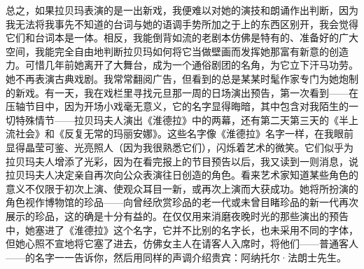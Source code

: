 \par 总之，如果拉贝玛表演的是一出新戏，我便难以对她的演技和朗诵作出判断，因为我无法将我事先不知道的台词与她的语调手势所加之于上的东西区别开，我会觉得它们和台词本是一体。相反，我能倒背如流的老剧本仿佛是特有的、准备好的广大空间，我能完全自由地判断拉贝玛如何将它当做壁画而发挥她那富有新意的创造力。可惜几年前她离开了大舞台，成为一个通俗剧团的名角，为它立下汗马功劳。她不再表演古典戏剧。我常常翻阅广告，但看到的总是某某时髦作家专门为她炮制的新戏。有一天，我在戏栏里寻找元旦那一周的日场演出预告，第一次看到——在压轴节目中，因为开场小戏毫无意义，它的名字显得晦暗，其中包含对我陌生的一切特殊情节——拉贝玛夫人演出《淮德拉》中的两幕，还有第二天第三天的《半上流社会》和《反复无常的玛丽安娜》。这些名字像《淮德拉》名字一样，在我眼前显得晶莹可鉴、光亮照人（因为我很熟悉它们），闪烁着艺术的微笑。它们似乎为拉贝玛夫人增添了光彩，因为在看完报上的节目预告以后，我又读到一则消息，说拉贝玛夫人决定亲自再次向公众表演往日创造的角色。看来艺术家知道某些角色的意义不仅限于初次上演、使观众耳目一新，或再次上演而大获成功。她将所扮演的角色视作博物馆的珍品——向曾经欣赏珍品的老一代或未曾目睹珍品的新一代再次展示的珍品，这的确是十分有益的。在仅仅用来消磨夜晚时光的那些演出的预告中，她塞进了《淮德拉》这个名字，它并不比别的名字长，也未采用不同的字体，但她心照不宣地将它塞了进去，仿佛女主人在请客人入席时，将他们——普通客人——的名字一一告诉你，然后用同样的声调介绍贵宾：阿纳托尔·法朗士先生。
